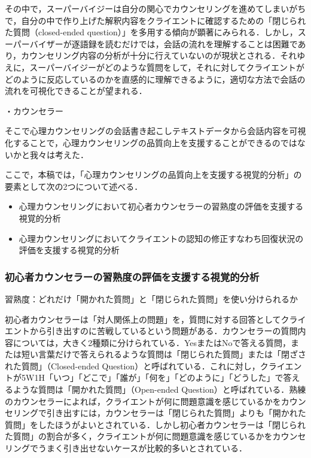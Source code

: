 \documentclass[shuuron]{kuee}
\begin{document}
その中で，スーパーバイジーは自分の関心でカウンセリングを進めてしまいがちで，自分の中で作り上げた解釈内容をクライエントに確認するための「閉じられた質問（closed-ended question）」を多用する傾向が顕著にみられる．しかし，スーパーバイザーが逐語録を読むだけでは，会話の流れを理解することは困難であり，カウンセリング内容の分析が十分に行えていないのが現状とされる．それゆえに，スーパーバイジーがどのような質問をして，それに対してクライエントがどのように反応しているのかを直感的に理解できるように，適切な方法で会話の流れを可視化できることが望まれる．



・カウンセラー

そこで心理カウンセリングの会話書き起こしテキストデータから会話内容を可視化することで，心理カウンセリングの品質向上を支援することができるのではないかと我々は考えた．

ここで，本稿では，「心理カウンセリングの品質向上を支援する視覚的分析」の要素として次の2つについて述べる．
\begin{itemize}
\item 心理カウンセリングにおいて初心者カウンセラーの習熟度の評価を支援する視覚的分析
\item 心理カウンセリングにおいてクライエントの認知の修正すなわち回復状況の評価を支援する視覚的分析
\end{itemize}




\subsubsection{初心者カウンセラーの習熟度の評価を支援する視覚的分析}


習熟度：どれだけ「開かれた質問」と「閉じられた質問」を使い分けられるか

初心者カウンセラーは「対人関係上の問題」を，質問に対する回答としてクライエントから引き出すのに苦戦しているという問題がある．カウンセラーの質問内容については，大きく2種類に分けられている．YesまたはNoで答える質問，または短い言葉だけで答えられるような質問は「閉じられた質問」または「閉ざされた質問」（Closed-ended Question）と呼ばれている．これに対し，クライエントが5W1H「いつ」「どこで」「誰が」「何を」「どのように」「どうした」で答えるような質問は「開かれた質問」（Open-ended Question）と呼ばれている．熟練のカウンセラーによれば，クライエントが何に問題意識を感じているかをカウンセリングで引き出すには，カウンセラーは「閉じられた質問」よりも「開かれた質問」をしたほうがよいとされている\cite{ivey}．しかし初心者カウンセラーは「閉じられた質問」の割合が多く，クライエントが何に問題意識を感じているかをカウンセリングでうまく引き出せないケースが比較的多いとされている．
\end{document}
